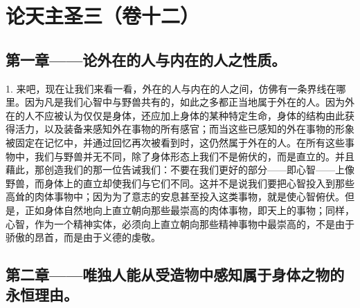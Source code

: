 

\section{论天主圣三（卷十二）}

\par


\subsection{第一章——论外在的人与内在的人之性质。}

1. 来吧，现在让我们来看一看，外在的人与内在的人之间，仿佛有一条界线在哪里。因为凡是我们心智中与野兽共有的，如此之多都正当地属于外在的人。因为外在的人不应被认为仅仅是身体，还应加上身体的某种特定生命，身体的结构由此获得活力，以及装备来感知外在事物的所有感官；而当这些已感知的外在事物的形象被固定在记忆中，并通过回忆再次被看到时，这仍然属于外在的人。在所有这些事物中，我们与野兽并无不同，除了身体形态上我们不是俯伏的，而是直立的。并且藉此，那创造我们的那一位告诫我们：不要在我们更好的部分——即心智——上像野兽，而身体上的直立却使我们与它们不同。这并不是说我们要把心智投入到那些高耸的肉体事物中；因为为了意志的安息甚至投入这类事物，就是使心智俯伏。但是，正如身体自然地向上直立朝向那些最崇高的肉体事物，即天上的事物；同样，心智，作为一个精神实体，必须向上直立朝向那些精神事物中最崇高的，不是由于骄傲的昂首，而是由于义德的虔敬。\par


\subsection{第二章——唯独人能从受造物中感知属于身体之物的永恒理由。}

